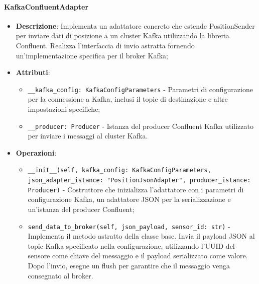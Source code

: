 \documentclass[10pt]{article}
\begin{document}
    \paragraph{KafkaConfluentAdapter}
    \begin{itemize} 
    \item \textbf{Descrizione}: Implementa un adattatore concreto che estende PositionSender per inviare dati di posizione a un cluster Kafka utilizzando la libreria Confluent. Realizza l'interfaccia di invio astratta fornendo un'implementazione specifica per il broker Kafka;
    \item \textbf{Attributi}:
    \begin{itemize}
        \item \texttt{\_\_kafka\_config: KafkaConfigParameters} - Parametri di configurazione per la connessione a Kafka, inclusi il topic di destinazione e altre impostazioni specifiche;
        \item \texttt{\_\_producer: Producer} - Istanza del producer Confluent Kafka utilizzato per inviare i messaggi al cluster Kafka.
    \end{itemize}
    
    \item \textbf{Operazioni}:
    \begin{itemize}
        \item \texttt{\_\_init\_\_(self, kafka\_config: KafkaConfigParameters, json\_adapter\_istance: "PositionJsonAdapter", producer\_istance: Producer)} - Costruttore che inizializza l'adattatore con i parametri di configurazione Kafka, un adattatore JSON per la serializzazione e un'istanza del producer Confluent;
        
        \item \texttt{send\_data\_to\_broker(self, json\_payload, sensor\_id: str)} - Implementa il metodo astratto della classe base. Invia il payload JSON al topic Kafka specificato nella configurazione, utilizzando l'UUID del sensore come chiave del messaggio e il payload serializzato come valore. Dopo l'invio, esegue un flush per garantire che il messaggio venga consegnato al broker.
    \end{itemize}
    \end{itemize}
\end{document}

